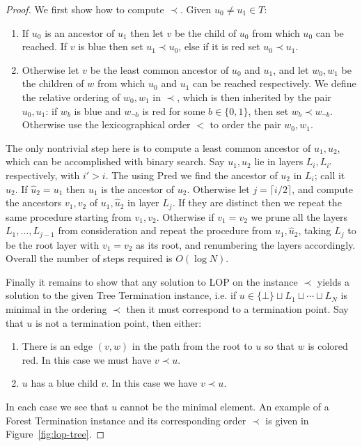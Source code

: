 \documentclass[11pt]{article}
\newcommand{\B}{\{0,1\}}
\begin{document}
\begin{proof}
We first show how to compute $\prec$. Given $u_{0} \neq u_{1} \in T$:
\begin{enumerate}
    \item If $u_0$ is an ancestor of $u_1$ then let $v$ be the child of $u_0$ from which $u_0$ can be reached. If $v$ is blue then set $u_1 \prec u_0$, else if it is red set $u_0 \prec u_1$.
    \item Otherwise let $v$ be the least common ancestor of $u_0$ and $u_1$, and let $w_0,w_1$ be the children of $w$ from which $u_0$ and $u_1$ can be reached respectively. We define the relative ordering of $w_0,w_1$ in $\prec$, which is then inherited by the pair $u_0,u_1$: if $w_b$ is blue and $w_{\lnot b}$ is red for some $b \in \B$, then set $w_b \prec w_{\lnot b}$. Otherwise use the lexicographical order $<$ to order the pair $w_0,w_1$.
\end{enumerate}
The only nontrivial step here is to compute a least common ancestor of $u_1,u_2$, which can be accomplished with binary search. Say $u_1,u_2$ lie in layers $L_i, L_{i'}$ respectively, with $i' > i$. The using $\mathrm{Pred}$ we find the ancestor of $u_2$ in $L_{i}$; call it $\hat{u}_2$. If $\hat{u}_2 = u_1$ then $u_1$ is the ancestor of $u_2$. Otherwise let $j = \lceil i/2 \rceil$, and compute the ancestors $v_1,v_2$ of $u_1, \hat{u}_2$ in layer $L_j$. If they are distinct then we repeat the same procedure starting from $v_1,v_2$. Otherwise if $v_1 = v_2$ we prune all the layers $L_1,\ldots,L_{j-1}$ from consideration and repeat the procedure from $u_1,\hat{u}_2$, taking $L_j$ to be the root layer with $v_1=v_2$ as its root, and renumbering the layers accordingly. Overall the number of steps required is $O(\log N)$.

Finally it remains to show that any solution to LOP on the instance $\prec$ yields a solution to the given Tree Termination instance, i.e. if $u \in\{\bot\} \sqcup L_1 \sqcup \cdots \sqcup L_N$ is minimal in the ordering $\prec$ then it must correspond to a termination point. Say that $u$ is not a termination point, then either:
\begin{enumerate}
    \item There is an edge $(v,w)$ in the path from the root to $u$ so that $w$ is colored red. In this case we must have $v \prec u$.
    \item $u$ has a blue child $v$. In this case we have $v \prec u$.
\end{enumerate}
In each case we see that $u$ cannot be the minimal element. An example of a Forest Termination instance and its corresponding order $\prec$ is given in Figure~\ref{fig:lop-tree}.
\end{proof}
\end{document}
